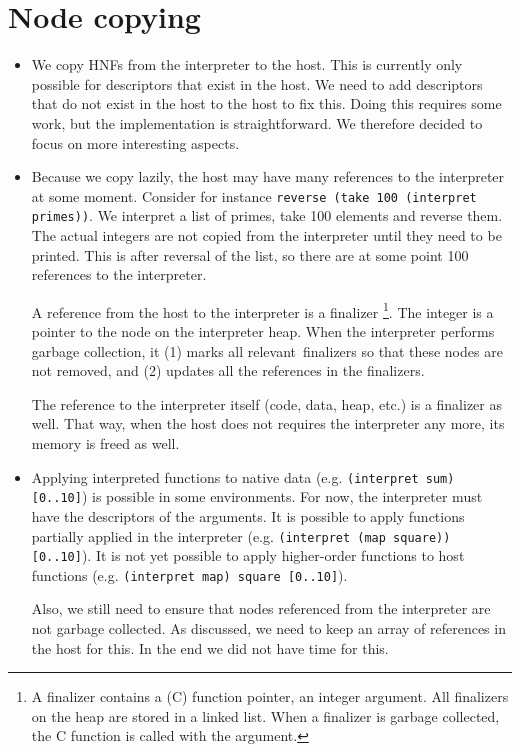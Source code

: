 \documentclass[a4paper]{article}
\begin{document}
\section*{Node copying}
\begin{itemize}
	\item
		We copy HNFs from the interpreter to the host.
		This is currently only possible for descriptors that exist in the host.
		We need to add descriptors that do not exist in the host to the host to fix this.
		Doing this requires some work, but the implementation is straightforward.
		We therefore decided to focus on more interesting aspects.

	\item
		Because we copy lazily, the host may have many references to the interpreter at some moment.
		Consider for instance \texttt{reverse (take 100 (interpret primes))}.
		We interpret a list of primes, take 100 elements and reverse them.
		The actual integers are not copied from the interpreter until they need to be printed.
		This is after reversal of the list, so there are at some point 100 references to the interpreter.

		A reference from the host to the interpreter is a finalizer%
			\footnote{A finalizer contains a (C) function pointer, an integer argument.
				All finalizers on the heap are stored in a linked list.
				When a finalizer is garbage collected, the C function is called with the argument.}.
		The integer is a pointer to the node on the interpreter heap.
		When the interpreter performs garbage collection, it
			(1) marks all relevant\footnotemark\ finalizers so that these nodes are not removed, and
			(2) updates all the references in the finalizers.

		The reference to the interpreter itself (code, data, heap, etc.) is a finalizer as well.
		That way, when the host does not requires the interpreter any more, its memory is freed as well.

	\item
		Applying interpreted functions to native data (e.g. \texttt{(interpret sum) [0..10]}) is possible in some environments.
		For now, the interpreter must have the descriptors of the arguments.
		It is possible to apply functions partially applied in the interpreter (e.g. \texttt{(interpret (map square)) [0..10]}).
		It is not yet possible to apply higher-order functions to host functions (e.g. \texttt{(interpret map) square [0..10]}).

		Also, we still need to ensure that nodes referenced from the interpreter are not garbage collected.
		As discussed, we need to keep an array of references in the host for this.
		In the end we did not have time for this.
\end{itemize}
\end{document}
